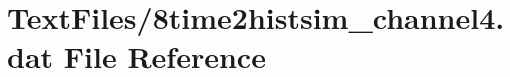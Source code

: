 \hypertarget{8time2histsim__channel4_8dat}{}\section{Text\+Files/8time2histsim\+\_\+channel4.dat File Reference}
\label{8time2histsim__channel4_8dat}
